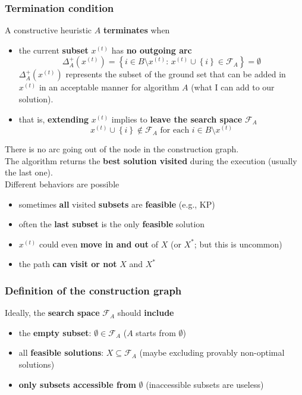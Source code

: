 \newpage

\subsubsection{Termination condition} 
A constructive heuristic $A$ \textbf{terminates} when
\begin{itemize}
	\item the current \textbf{subset} $x^{(t)}$ has \textbf{no outgoing arc}
	$$ \Delta^+_A \left(x^{(t)}\right) = \left\{i \in B \setminus x^{(t)} : \, x^{(t)} \cup \left\{i\right\} \in \mathcal{F}_A \right\} = \emptyset $$
	$\Delta^+_A \left(x^{(t)}\right)$ represents the subset of the ground set that can be added in $x^{(t)}$ in an acceptable manner for algorithm $A$ (what I can add to our solution).\\
	
	\item that is, \textbf{extending} $x^{(t)}$ implies to \textbf{leave the search space} $\mathcal{F}_A$
	$$ x^{(t)} \cup \left\{i\right\} \notin \mathcal{F}_A \text{ for each } i \in B \setminus x^{(t)}$$
\end{itemize}

There is no arc going out of the node in the construction graph.\\

The algorithm returns the \textbf{best solution visited} during the execution (usually the last one).\\

Different behaviors are possible
\begin{itemize}
	\item sometimes \textbf{all} visited \textbf{subsets} are \textbf{feasible} (e.g., KP)
	\item often the \textbf{last subset} is the only \textbf{feasible} solution
	\item $x^{(t)}$ could even \textbf{move in and out} of $X$ (or $X^\ast$; but this is uncommon)
	\item the path \textbf{can visit or not} $X$ and $X^\ast$
\end{itemize}

\newpage

\subsubsection{Definition of the construction graph}
Ideally, the \textbf{search space} $\mathcal{F}_A$ should \textbf{include}
\begin{itemize}
	\item the \textbf{empty subset}: $\emptyset \in \mathcal{F}_A$ ($A$ starts from $\emptyset$)
	\item all \textbf{feasible solutions}: $X \subseteq \mathcal{F}_A$ (maybe excluding provably non-optimal solutions)
	\item \textbf{only subsets accessible from} $\emptyset$ (inaccessible subsets are useless)
\end{itemize}

